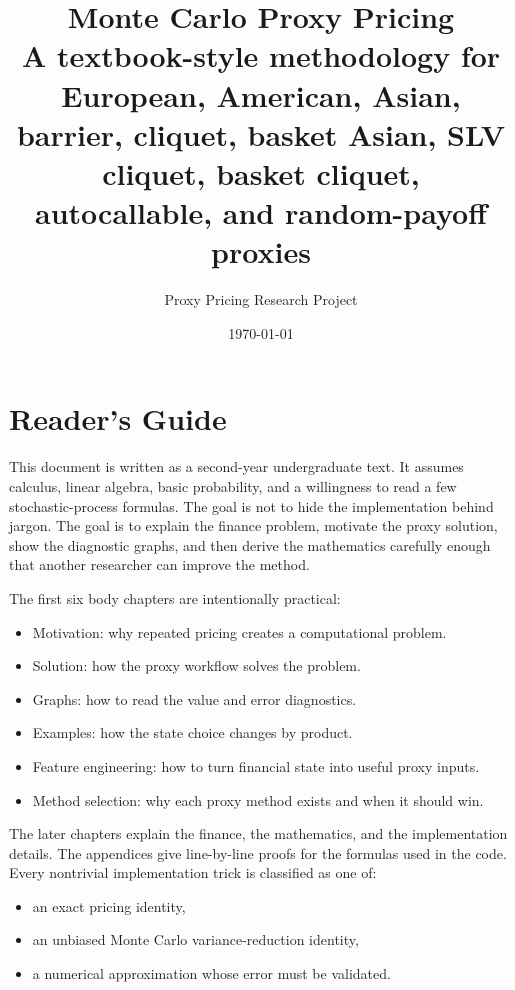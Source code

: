 \documentclass[11pt,oneside]{book}
\title{\textbf{Monte Carlo Proxy Pricing}\\
\large A textbook-style methodology for European, American, Asian, barrier, cliquet, basket Asian, SLV cliquet, basket cliquet, autocallable, and random-payoff proxies}
\author{Proxy Pricing Research Project}
\date{\today}
\theoremstyle{definition}
\begin{document}
\frontmatter
\maketitle
\tableofcontents

\chapter*{Reader's Guide}
This document is written as a second-year undergraduate text. It assumes calculus, linear algebra, basic probability, and a willingness to read a few stochastic-process formulas. The goal is not to hide the implementation behind jargon. The goal is to explain the finance problem, motivate the proxy solution, show the diagnostic graphs, and then derive the mathematics carefully enough that another researcher can improve the method.

The first six body chapters are intentionally practical:
\begin{itemize}
  \item Motivation: why repeated pricing creates a computational problem.
  \item Solution: how the proxy workflow solves the problem.
  \item Graphs: how to read the value and error diagnostics.
  \item Examples: how the state choice changes by product.
  \item Feature engineering: how to turn financial state into useful proxy inputs.
  \item Method selection: why each proxy method exists and when it should win.
\end{itemize}

The later chapters explain the finance, the mathematics, and the implementation details. The appendices give line-by-line proofs for the formulas used in the code. Every nontrivial implementation trick is classified as one of:
\begin{itemize}
  \item an exact pricing identity,
  \item an unbiased Monte Carlo variance-reduction identity,
  \item a numerical approximation whose error must be validated.
\end{itemize}
\end{document}
